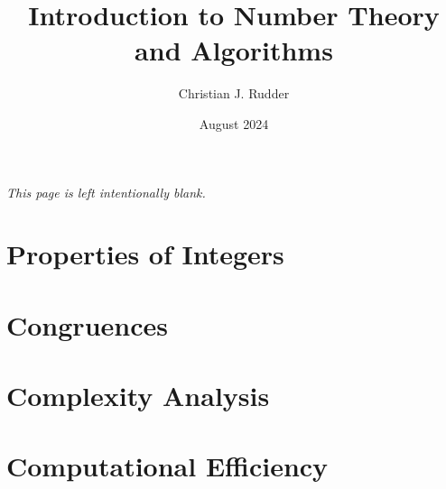 \documentclass{memoir}
\title{Introduction to Number Theory and Algorithms}
\author{Christian J. Rudder}
\date{August 2024}
\begin{document}
\maketitle
\setcounter{tocdepth}{2}

\tableofcontents

\newpage
\thispagestyle{empty}
\mbox{}
\vfill
\begin{center}
    \textit{This page is left intentionally blank.}
\end{center}
\vfill
\newpage




\chapter{Properties of Integers}





\chapter{Congruences}








\chapter{Complexity Analysis}





\chapter{Computational Efficiency}

\end{document}
